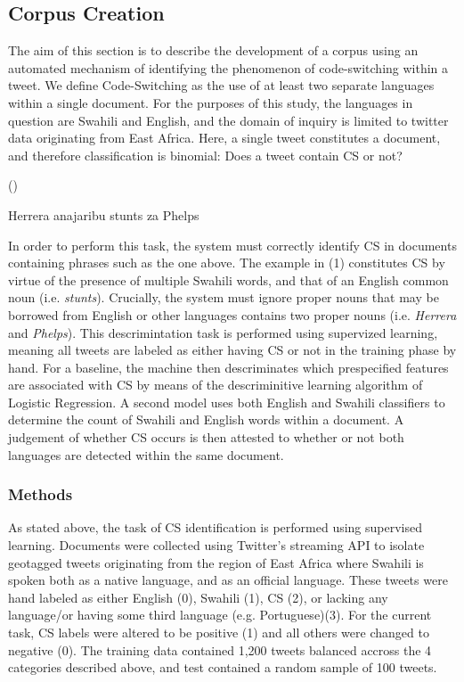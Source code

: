 \documentclass[12pt]{article}\usepackage[]{graphicx}\usepackage[]{color}
\newcommand{\eq}[1]{\bigskip\par
\stepcounter{equation}
\noindent\parbox{.5in}{(\theequation)}
\begin{minipage}[t]{4.5in}
#1
\end{minipage}
\par\bigskip}
\begin{document}
\subsection{Corpus Creation}

The aim of this section is to describe the development of a corpus using an automated mechanism of identifying the phenomenon of code-switching within a tweet. We define Code-Switching as the use of at least two separate languages within a single document. For the purposes of this study, the languages in question are Swahili and English, and the domain of inquiry is limited to twitter data originating from East Africa. Here, a single tweet constitutes a document, and therefore classification is binomial: Does a tweet contain CS or not?

\eq{
Herrera anajaribu stunts za Phelps
}

In order to perform this task, the system must correctly identify CS in documents containing phrases such as the one above. The example in (1) constitutes CS by virtue of the presence of multiple Swahili words, and that of an English common noun (i.e. \textit{stunts}). Crucially, the system must ignore proper nouns that may be borrowed from English or other languages  contains two proper nouns (i.e. \textit{Herrera} and \textit{Phelps}). This descrimintation task is performed using supervized learning, meaning  all tweets are labeled as either having CS or not in the training phase by hand. For a baseline, the machine then descriminates which prespecified features are associated with CS by means of the descriminitive learning algorithm of Logistic Regression. A second model  uses both English and Swahili classifiers to determine the count of Swahili and English words within a document. A judgement of whether CS occurs is then attested to whether or not both languages are detected within the same document.

\subsubsection{Methods}

As stated above, the task of CS identification is performed using supervised learning. Documents were collected using Twitter's streaming API to isolate geotagged tweets originating from the region of East Africa where Swahili is spoken both as a native language, and as an official language. These tweets were hand labeled as either English (0), Swahili (1), CS (2), or lacking any language/or having some third language (e.g. Portuguese)(3). For the current task, CS labels were altered to be positive (1) and all others were changed to negative (0). The training data contained 1,200 tweets balanced accross the 4 categories described above, and test contained a random sample of 100 tweets.
\end{document}
